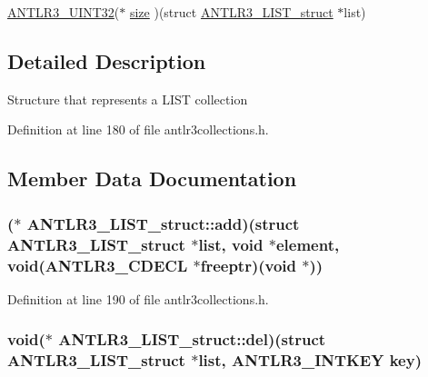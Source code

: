 \begin{DoxyCompactItemize}
\item 
\hyperlink{antlr3defs_8h_ac41f744abd0fd25144b9eb9d11b1dfd1}{A\-N\-T\-L\-R3\-\_\-\-U\-I\-N\-T32}($\ast$ \hyperlink{struct_a_n_t_l_r3___l_i_s_t__struct_adbf6732ad9cc35ad516fb8bd24eb21a4}{size} )(struct \hyperlink{struct_a_n_t_l_r3___l_i_s_t__struct}{A\-N\-T\-L\-R3\-\_\-\-L\-I\-S\-T\-\_\-struct} $\ast$list)
\end{DoxyCompactItemize}


\subsection{Detailed Description}
Structure that represents a L\-I\-S\-T collection 

Definition at line 180 of file antlr3collections.\-h.



\subsection{Member Data Documentation}
\hypertarget{struct_a_n_t_l_r3___l_i_s_t__struct_a65dd3a65b4b1582ca87178300b030a77}{
\subsubsection[{add}]{($\ast$ A\-N\-T\-L\-R3\-\_\-\-L\-I\-S\-T\-\_\-struct\-::add)(struct {\bf A\-N\-T\-L\-R3\-\_\-\-L\-I\-S\-T\-\_\-struct} $\ast$list, void $\ast$element, void({\bf A\-N\-T\-L\-R3\-\_\-\-C\-D\-E\-C\-L} $\ast$freeptr)(void $\ast$))}}\label{struct_a_n_t_l_r3___l_i_s_t__struct_a65dd3a65b4b1582ca87178300b030a77}


Definition at line 190 of file antlr3collections.\-h.

\hypertarget{struct_a_n_t_l_r3___l_i_s_t__struct_a5f19ce534e2425ed9e4e1f4ca35d198a}{
\subsubsection[{del}]{\setlength{\rightskip}{0pt plus 5cm}void($\ast$ A\-N\-T\-L\-R3\-\_\-\-L\-I\-S\-T\-\_\-struct\-::del)(struct {\bf A\-N\-T\-L\-R3\-\_\-\-L\-I\-S\-T\-\_\-struct} $\ast$list, {\bf A\-N\-T\-L\-R3\-\_\-\-I\-N\-T\-K\-E\-Y} key)}}\label{struct_a_n_t_l_r3___l_i_s_t__struct_a5f19ce534e2425ed9e4e1f4ca35d198a}


